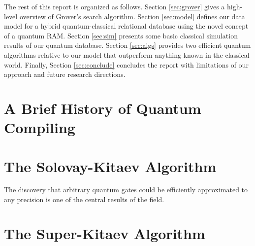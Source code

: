 \documentclass{toc}
\theoremstyle{plain}
\theoremstyle{definition}
\begin{document}
The rest of this report is organized as follows.
Section \ref{sec:grover} gives a high-level overview of Grover's
search algorithm.
Section \ref{sec:model}
defines our data model for a hybrid quantum-classical
relational database using the novel concept of a quantum RAM.
Section \ref{sec:sim} presents
some basic classical simulation results of our quantum database.
Section \ref{sec:algs} provides two
efficient quantum algorithms relative to our model that outperform
anything known in the classical world.
Finally, Section \ref{sec:conclude} concludes the report with limitations
of our approach and future research directions.

\section{A Brief History of Quantum Compiling}
\label{sec:history}

\section{The Solovay-Kitaev Algorithm}
\label{sec:solovay-kitaev}

The discovery that arbitrary quantum gates could be efficiently approximated to any
precision is one of the central results of the field.

\section{The Super-Kitaev Algorithm}
\end{document}
